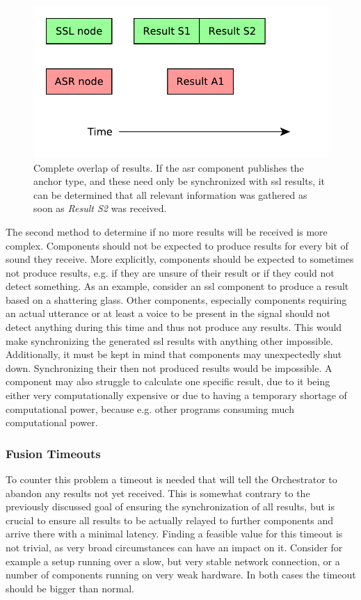 \begin{figure}[]
	\centering
	\includegraphics[width=.66\textwidth]{diagrams/main_orc_all_results.pdf}
	\caption{Complete overlap of results.
		If the \gls{asr} component publishes the anchor type, and these need only be synchronized with \gls{ssl} results, it can be determined that all relevant information was gathered as soon as \textit{Result S2} was received.}
	\label{pic:main:orc:all_results}
\end{figure}

The second method to determine if no more results will be received is more complex.
Components should not be expected to produce results for every bit of sound they receive.
More explicitly, components should be expected to sometimes not produce results, e.g. if they are unsure of their result or if they could not detect something.
As an example, consider an \gls{ssl} component to produce a result based on a shattering glass.
Other components, especially components requiring an actual utterance or at least a voice to be present in the signal should not detect anything during this time and thus not produce any results.
This would make synchronizing the generated \gls{ssl} results with anything other impossible. 
Additionally, it must be kept in mind that components may unexpectedly shut down.
Synchronizing their then not produced results would be impossible.
A component may also struggle to calculate one specific result, due to it being either very computationally expensive or due to having a temporary shortage of computational power, because e.g. other programs consuming much computational power.

\subsubsection{Fusion Timeouts}
To counter this problem a timeout is needed that will tell the Orchestrator to abandon any results not yet received.
This is somewhat contrary to the previously discussed goal of ensuring the synchronization of all results, but is crucial to ensure all results to be actually relayed to further components and arrive there with a minimal latency.
Finding a feasible value for this timeout is not trivial, as very broad circumstances can have an impact on it.
Consider for example a setup running over a slow, but very stable network connection, or a number of components running on very weak hardware.
In both cases the timeout should be bigger than normal.

